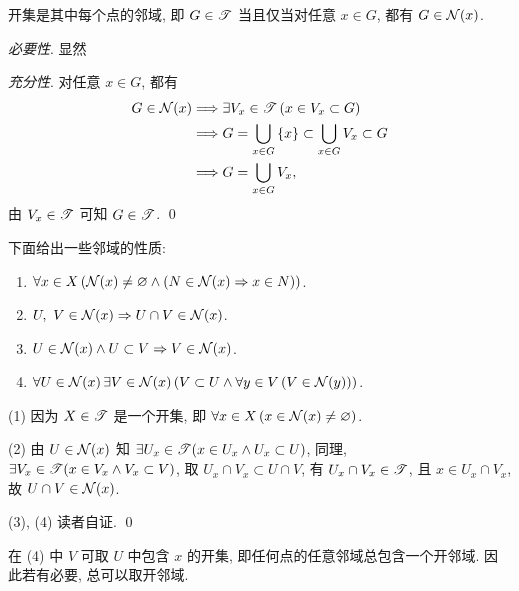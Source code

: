     \begin{Proposition}\label{prop:开集与邻域}
        开集是其中每个点的邻域, 即 $ G\in\mathscr{T} $ 当且仅当对任意 $ x\in G $, 都有 $ G\in\mathcal{N}(x) $.
    \end{Proposition}
    \begin{Proof}
        \textsl{必要性}. 显然

        \textsl{充分性}. 对任意 $ x\in G $, 都有
        \begin{align*}
            G\in\mathcal{N}(x) & \Longrightarrow \exists V_{x}\in\mathscr{T}\,(x\in V_{x}\subset G)\\
            & \Longrightarrow G=\bigcup_{x\in G}\left\{ x \right\}\subset \bigcup_{x\in G}V_{x}\subset G\\
            & \Longrightarrow G=\bigcup_{x\in G}V_{x},
        \end{align*}
        由 $ V_{x}\in\mathscr{T} $ 可知 $ G\in\mathscr{T} $. \qed
    \end{Proof}

    \begin{Proposition}[邻域的性质]\label{prop:邻域的性质}
        下面给出一些邻域的性质:
        \begin{enumerate}
            \item $ \forall x\in X\,(\mathcal{N}(x)\neq\varnothing \land (N\in\mathcal{N}(x)\Rightarrow x\in N)) $.
            \item $ U,\ V\in\mathcal{N}(x)\Rightarrow U\cap V\in\mathcal{N}(x) $.
            \item $ U\in\mathcal{N}(x)\land U\subset V\Rightarrow V\in \mathcal{N}(x) $.
            \item $ \forall U\in\mathcal{N}(x)\,\exists V\in\mathcal{N}(x)\,(V\subset U\land \forall y\in V\,(V\in\mathcal{N}(y))) $.
        \end{enumerate}
    \end{Proposition}
    \begin{Proof}
        (1) 因为 $ X\in\mathscr{T} $ 是一个开集, 即 $ \forall x\in X\,(x\in\mathcal{N}(x)\ne \varnothing) $.

        (2) 由 $ U\in\mathcal{N}(x) $ 知 $ \exists U_{x}\in\mathscr{T}(x\in U_{x}\land U_{x}\subset U) $, 同理, $ \exists V_{x}\in\mathscr{T}(x\in V_{x}\land V_{x}\subset V) $, 取 $ U_{x}\cap V_{x}\subset U\cap V $, 有 $ U_{x}\cap V_{x}\in\mathscr{T} $, 且 $ x\in U_{x}\cap V_{x} $, 故 $ U\cap V\in \mathcal{N}(x) $.

        (3), (4) 读者自证. \qed 
    \end{Proof}

    \begin{Remark}
        在 (4) 中 $ V $ 可取 $ U $ 中包含 $ x $ 的开集, 即任何点的任意邻域总包含一个开邻域. 因此若有必要, 总可以取开邻域. 
    \end{Remark}

